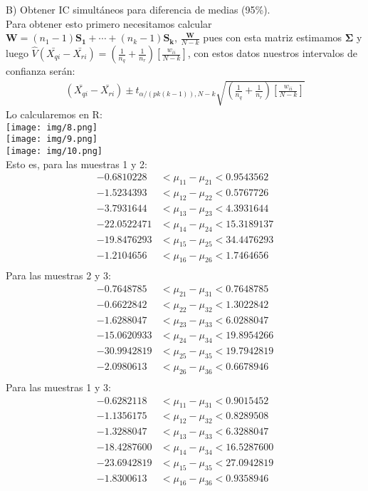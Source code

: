\begin{sol}
B) Obtener IC simultáneos para diferencia de medias (95\%).\\
Para obtener esto primero necesitamos calcular $\bm{W}=(n_1-1)\bm{S_1}+\cdots+(n_k-1)\bm{S_k}$, $\frac{\bm{W}}{N-k}$ pues con esta matriz estimamos $\bm{\Sigma}$ y luego $\hat{V}(\bar{X_{qi}}-\bar{X_{ri}})=(\frac{1}{n_q}+\frac{1}{n_r})[\frac{w_{ii}}{N-k}]$, con estos datos nuestros intervalos de confianza serán:
\begin{align*}
(\bar{X_{qi}}-\bar{X_{ri}}) \pm t_{\alpha/(pk(k-1)),N-k}\sqrt{(\frac{1}{n_q}+\frac{1}{n_r})[\frac{w_{ii}}{N-k}]}
\end{align*}
Lo calcularemos en R:\\
\texttt{[image: img/8.png]}\\
\texttt{[image: img/9.png]}\\
\texttt{[image: img/10.png]}\\
Esto es, para las muestras 1 y 2:
\begin{align*}
-0.6810228 &< \mu_{11} - \mu_{21} < 0.9543562 \\
-1.5234393 &< \mu_{12} - \mu_{22} < 0.5767726 \\
-3.7931644 &< \mu_{13} - \mu_{23} < 4.3931644 \\
-22.0522471 &< \mu_{14} - \mu_{24} < 15.3189137 \\
-19.8476293 &< \mu_{15} - \mu_{25} < 34.4476293 \\
-1.2104656 &< \mu_{16} - \mu_{26} < 1.7464656 \\
\end{align*}
Para las muestras 2 y 3:
\begin{align*}
-0.7648785 &< \mu_{21} - \mu_{31} < 0.7648785 \\
-0.6622842 &< \mu_{22} - \mu_{32} < 1.3022842 \\
-1.6288047 &< \mu_{23} - \mu_{33} < 6.0288047 \\
-15.0620933 &< \mu_{24} - \mu_{34} < 19.8954266 \\
-30.9942819 &< \mu_{25} - \mu_{35} < 19.7942819 \\
-2.0980613 &< \mu_{26} - \mu_{36} < 0.6678946 \\
\end{align*}
Para las muestras 1 y 3:
\begin{align*}
-0.6282118 &< \mu_{11} - \mu_{31} < 0.9015452 \\
-1.1356175 &< \mu_{12} - \mu_{32} < 0.8289508 \\
-1.3288047 &< \mu_{13} - \mu_{33} < 6.3288047 \\
-18.4287600 &< \mu_{14} - \mu_{34} < 16.5287600 \\
-23.6942819 &< \mu_{15} - \mu_{35} < 27.0942819 \\
-1.8300613 &< \mu_{16} - \mu_{36} < 0.9358946 \\
\end{align*}


\end{sol}
